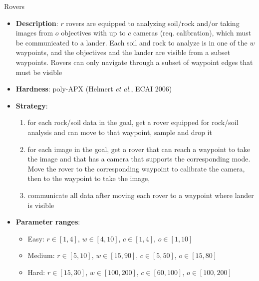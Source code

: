 \documentclass[aspectratio=169,xcolor=dvipsnames]{beamer}
\begin{document}
\begin{frame}{Rovers}

    \begin{itemize}
        \item \textbf{Description}: $r$ rovers are equipped to analyzing soil/rock and/or taking images from $o$ objectives with up to $c$ cameras (req. calibration), which must be communicated to a lander. Each soil and rock to analyze is in one of the $w$ waypoints, and the objectives and the lander are visible from a subset waypoints. Rovers can only navigate through a subset of waypoint edges that must be visible
        \item \textbf{Hardness}: poly-APX (Helmert \textit{et al.}, ECAI 2006)
        \item \textbf{Strategy}:
        \begin{enumerate}
            \item for each rock/soil data in the goal, get a rover equipped for rock/soil analysis and can move to that waypoint, sample and drop it
            \item for each image in the goal, get a rover that can reach a waypoint to take the image and that has a camera that supports the corresponding mode. Move the rover to the corresponding waypoint to calibrate the camera, then to the waypoint to take the image,
            \item communicate all data after moving each rover to a waypoint where lander is visible
        \end{enumerate}
        \item \textbf{Parameter ranges}:
        \begin{itemize}
            \item Easy: $r\in[1, 4]$, $w\in[4, 10]$, $c\in[1, 4]$, $o\in[1, 10]$
            \item Medium: $r\in[5, 10]$, $w\in[15, 90]$, $c\in[5, 50]$, $o\in[15, 80]$
            \item Hard: $r\in[15, 30]$, $w\in[100, 200]$, $c\in[60, 100]$, $o\in[100, 200]$
        \end{itemize}
    \end{itemize}

\end{frame}
\end{document}
